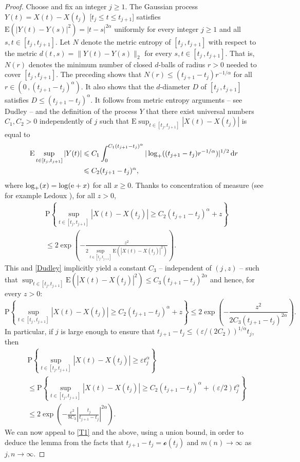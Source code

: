 \documentclass[reqno]{amsart}
\newcommand{\<}{\langle}
\renewcommand{\>}{\rangle}
\renewcommand{\P}{\mathrm{P}}
\newcommand{\E}{\mathrm{E}}
\newcommand{\1}{\mathbb{1}}
\renewcommand{\d}{{\rm d}}
\newcommand{\e}{{\rm e}}
\renewcommand{\ge}{\geqslant}
\renewcommand{\le}{\leqslant}
\theoremstyle{definition}
\numberwithin{equation}{section}
\begin{document}
\begin{proof}
	Choose and fix an integer $j\ge1$. The Gaussian process $Y(t) = X(t)-X(t_j)$ 
	[$t_j \le t\le t_{j+1}$] satisfies
	$\E( |Y(t)-Y(s)|^2) =  |t-s|^{2\alpha}$
	uniformly for every integer $j\ge1$ and all $s,t\in[t_j\,,t_{j+1}]$.
	Let $N$ denote the metric entropy of $[t_j\,,t_{j+1}]$ with respect to the
	metric $d(t\,,s)=\|Y(t)-Y(s)\|_2$ for every $s,t\in[t_j\,,t_{j+1}]$. That is,
	$N(r)$ denotes the minimum number of closed $d$-balls of radius $r>0$
	needed to cover $[t_j\,,t_{j+1}]$. The preceding
	shows that $N(r) \le (t_{j+1}-t_j) r^{-1/\alpha}$ for all $r\in (0\,,(t_{j+1}-t_j)^\alpha )$.
	It also shows that the $d$-diameter $D$ of $[t_j\,,t_{j+1}]$ satisfies $D\le (t_{j+1}-t_j)^\alpha$.
	It follows from metric entropy arguments -- see Dudley
	\cite{Dudley1967} -- and the definition of the process $Y$ that 
	there exist universal numbers $C_1,C_2>0$ independently of $j$ such that
	$\E\sup_{t\in[t_j,t_{j+1}]}|X(t)-X(t_j)| $ is equal to
	\begin{align}\begin{split}\label{Dudley}
		\E\sup_{t\in[t_j,t_{j+1}]}|Y(t)| 
		&\le C_1 \int_0^{C_1(t_{j+1}-t_j)^\alpha} |\log_+((t_{j+1}-t_j) r^{-1/\alpha})|^{1/2}\,\d r\\
		&\le C_2 (t_{j+1}-t_j)^\alpha,
	\end{split}\end{align}
	where $\log_+(x)=\log(\e+x)$ for all $x\ge0$. 
	Thanks to concentration of measure
	(see for example Ledoux \cite[Chapter 2]{Ledoux}),
	for all $z>0$,
	\begin{align*}
		&\textstyle\P\left\{ \sup_{t\in[t_j,t_{j+1}]}|X(t)-X(t_j)| 
			\ge C_2 (t_{j+1}-t_j)^\alpha + z \right\}\\
		&\le 2\exp\left(-\frac{z^2}{2\sup_{t\in[t_j,t_{j+1}]}
			\E(|X(t)-X(t_j)|^2)} \right).
	\end{align*}
	This and \eqref{Dudley}
	implicitly yield a constant $C_3$ --  independent of $(j\,,z)$ -- such that
	$\sup_{t\in[t_j,t_{j+1}]}\E(|X(t)-X(t_j)|^2) \le 
	C_3 (t_{j+1}-t_j)^{2\alpha}$
	and hence, for every $z>0$:
	\[
		\P\left\{ \sup_{t\in[t_j\,,t_{j+1}]}|X(t)-X(t_j)| 
		\ge C_2 (t_{j+1}-t_j)^\alpha + z \right\}
		\le 2\exp\left(-\frac{z^2}{2C_3(t_{j+1}-t_j)^{2\alpha}} \right).
	\]
	In particular, if $j$ is large enough to ensure that 
	$t_{j+1}-t_j\le (\varepsilon/(2C_2))^{1/\alpha} t_j$, then
	\begin{align*}
		&\textstyle\P\left\{
			\sup_{t\in[t_j,t_{j+1}]} |X(t)-X(t_j)| \ge \varepsilon t_j^\alpha\right\}\\
		&\textstyle\le\P\left\{ \sup_{t\in[t_j,t_{j+1}]}|X(t)-X(t_j)| 
			\ge C_2 (t_{j+1}-t_j)^\alpha + (\varepsilon/2)t_j^\alpha \right\}\\
		&\le 2\exp\left(-\frac{\varepsilon^2}{8C_3}
			\left|\frac{t_j}{t_{j+1}-t_j}\right|^{2\alpha} \right).
	\end{align*}
	We can now appeal to \eqref{T1} and the above, using a union bound,
	in order to deduce the lemma from the facts that $t_{j+1}-t_j=\mathcal{o}(t_j)$
	and $m(n)\to\infty$ as $j,n\to\infty$.
\end{proof}
\end{document}
